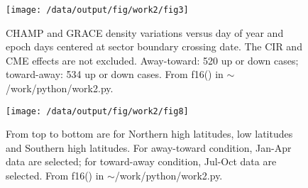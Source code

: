 \documentclass[12pt,a4paper]{article}
\begin{document}
\begin{figure}[!ht]
    \begin{center}
        \texttt{[image: /data/output/fig/work2/fig3]}
        \caption{CHAMP and GRACE density variations versus day of year and epoch days centered at sector boundary crossing date. The CIR and CME effects are not excluded. Away-toward: 520 up or down cases; toward-away: 534 up or down cases. From f16() in $\sim$/work/python/work2.py. }
    \end{center}
    \label{fig3}
\end{figure}

\begin{figure}[!ht]
    \begin{center}
        \texttt{[image: /data/output/fig/work2/fig8]}
        \caption{From top to bottom are for Northern high latitudes, low latitudes and Southern high latitudes. For away-toward condition, Jan-Apr data are selected; for toward-away condition, Jul-Oct data are selected. From f16() in $\sim$/work/python/work2.py.}
    \end{center}
    \label{fig8}
\end{figure}
\end{document}
